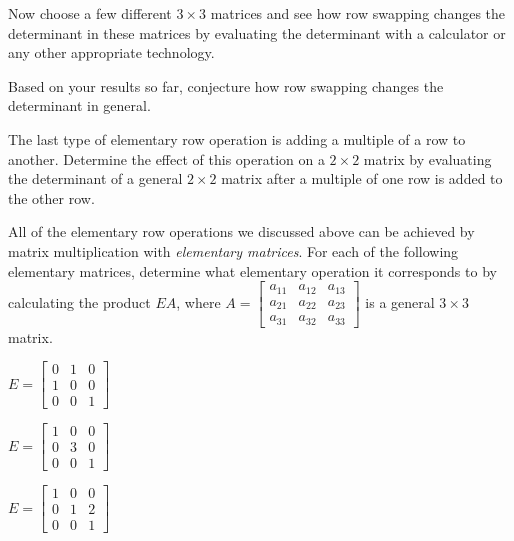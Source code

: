 \begin{pa}
\item Now choose a few different $3\times 3$ matrices and see how row swapping changes the determinant in these matrices by evaluating the determinant with a calculator or any other appropriate technology. 



\item Based on your results so far, conjecture how row swapping changes the determinant in general.



\ea

\item The last type of elementary row operation is adding a multiple of a row to another. Determine the effect of this operation on a $2\times 2$ matrix by evaluating the determinant of a general $2\times 2$ matrix after a multiple of one row is added to the other row.



\item All of the elementary row operations we discussed above can be achieved by matrix multiplication with \emph{elementary matrices}. For each of the following elementary matrices, determine what elementary operation it corresponds to by calculating the product $EA$, where  $A = \left[ \begin{array}{ccc} a_{11}&a_{12}&a_{13}\\a_{21}&a_{22}&a_{23}\\a_{31}&a_{32}&a_{33} \end{array} \right]$ is a general $3\times 3$ matrix.


\ba 
\begin{minipage}{1.5in} 
\item $E = \left[ \begin{array}{ccc} 0&1&0\\ 1&0&0 \\ 0&0&1 \end{array} \right]$
\end{minipage}
\begin{minipage}{1.5in} 
\item $E = \left[ \begin{array}{ccc} 1&0&0\\ 0&3&0 \\ 0&0&1 \end{array} \right]$
\end{minipage}
\begin{minipage}{1.5in} 
\item $E = \left[ \begin{array}{ccc} 1&0&0\\ 0&1&2 \\ 0&0&1 \end{array} \right]$
\end{minipage}

\ea


\ee

\end{pa}


